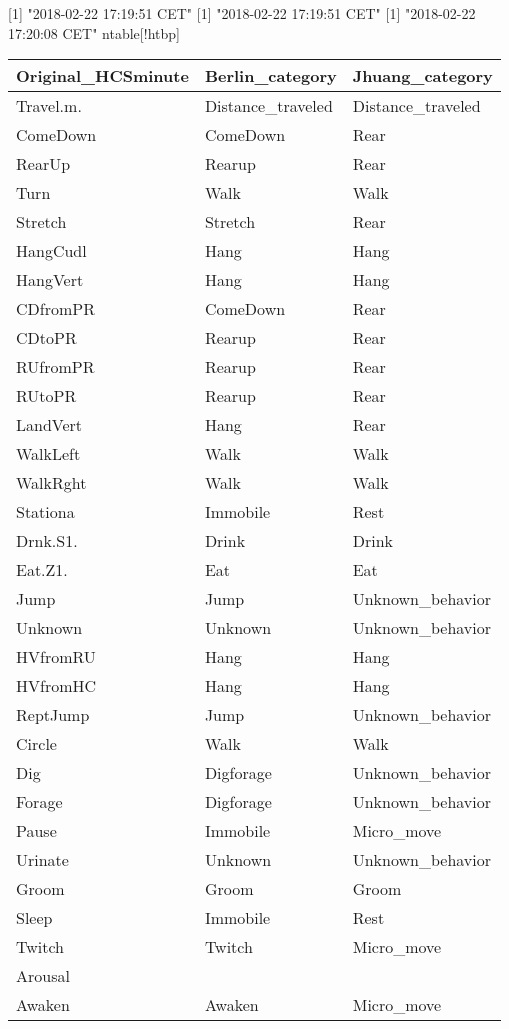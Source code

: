 [1] "2018-02-22 17:19:51 CET"
[1] "2018-02-22 17:19:51 CET"
[1] "2018-02-22 17:20:08 CET"
n{table}[!htbp]
\centering
\begin{tabular}{|l|l|l|}
  \hline
Original\_HCSminute & Berlin\_category & Jhuang\_category \\ 
  \hline
Travel.m. & Distance\_traveled & Distance\_traveled \\ 
  ComeDown & ComeDown & Rear \\ 
  RearUp & Rearup & Rear \\ 
  Turn & Walk & Walk \\ 
  Stretch & Stretch & Rear \\ 
  HangCudl & Hang & Hang \\ 
  HangVert & Hang & Hang \\ 
  CDfromPR & ComeDown & Rear \\ 
  CDtoPR & Rearup & Rear \\ 
  RUfromPR & Rearup & Rear \\ 
  RUtoPR & Rearup & Rear \\ 
  LandVert & Hang & Rear \\ 
  WalkLeft & Walk & Walk \\ 
  WalkRght & Walk & Walk \\ 
  Stationa & Immobile & Rest \\ 
  Drnk.S1. & Drink & Drink \\ 
  Eat.Z1. & Eat & Eat \\ 
  Jump & Jump & Unknown\_behavior \\ 
  Unknown & Unknown & Unknown\_behavior \\ 
  HVfromRU & Hang & Hang \\ 
  HVfromHC & Hang & Hang \\ 
  ReptJump & Jump & Unknown\_behavior \\ 
  Circle & Walk & Walk \\ 
  Dig & Digforage & Unknown\_behavior \\ 
  Forage & Digforage & Unknown\_behavior \\ 
  Pause & Immobile & Micro\_move \\ 
  Urinate & Unknown & Unknown\_behavior \\ 
  Groom & Groom & Groom \\ 
  Sleep & Immobile & Rest \\ 
  Twitch & Twitch & Micro\_move \\ 
  Arousal &  &  \\ 
  Awaken & Awaken & Micro\_move \\ 

\end{tabular}
